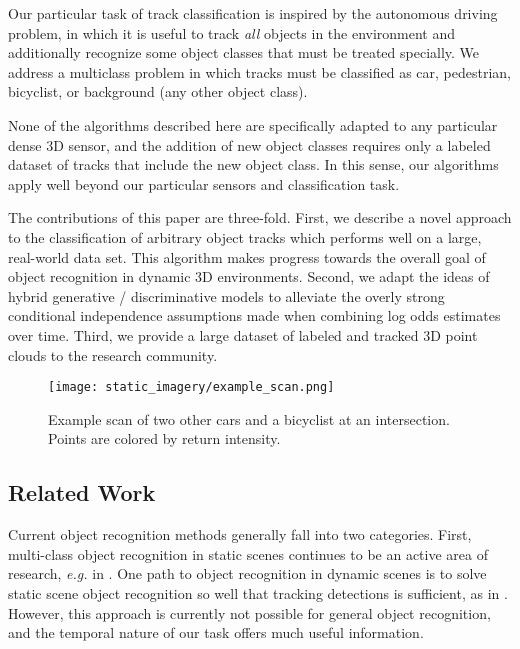 \documentclass[letterpaper, 10 pt, conference]{ieeeconf}  %
\begin{document}
Our particular task of track classification is inspired by the autonomous driving problem, in which it is useful to track \textit{all} objects in the environment and additionally recognize some object classes that must be treated specially.  We address a multiclass problem in which tracks must be classified as car, pedestrian, bicyclist, or background (any other object class).

None of the algorithms described here are specifically adapted to any particular dense 3D sensor, and the addition of new object classes requires only a labeled dataset of tracks that include the new object class. In this sense, our algorithms apply well beyond our particular sensors and classification task.

The contributions of this paper are three-fold.  First, we describe a novel approach to the classification of arbitrary object tracks which performs well on a large, real-world data set.  This algorithm makes progress towards the overall goal of object recognition in dynamic 3D environments.  Second, we adapt the ideas of hybrid generative / discriminative models \cite{Raina2004} to alleviate the overly strong conditional independence assumptions made when combining log odds estimates over time.  Third, we provide a large dataset of labeled and tracked 3D point clouds to the research community.


\begin{figure}
  \centering
  \texttt{[image: static\_imagery/example\_scan.png]}
  \caption{Example scan of two other cars and a bicyclist at an intersection.  Points are colored by return intensity.}
\end{figure}


\subsection{Related Work}

Current object recognition methods generally fall into two categories.  First, multi-class object recognition in static scenes continues to be an active area of research, \textit{e.g.} in \cite{Lai2009, Triebel2007, Douillard2009, Spinello2010a, Espinace2010}.  One path to object recognition in dynamic scenes is to solve static scene object recognition so well that tracking detections is sufficient, as in \cite{Bansal2010, Gavrila2006}.  However, this approach is currently not possible for general object recognition, and the temporal nature of our task offers much useful information.
\end{document}
